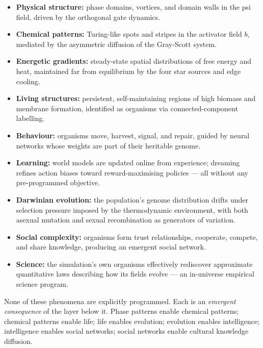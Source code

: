 \documentclass[12pt,a4paper]{article}
\begin{document}
\begin{itemize}
  \item \textbf{Physical structure:} phase domains, vortices,
    and domain walls in the psi field,
    driven by the orthogonal gate dynamics.

  \item \textbf{Chemical patterns:} Turing-like spots and stripes
    in the activator field $b$, mediated by the
    asymmetric diffusion of the Gray-Scott system.

  \item \textbf{Energetic gradients:} steady-state spatial
    distributions of free energy and heat, maintained far from
    equilibrium by the four star sources and edge cooling.

  \item \textbf{Living structures:} persistent, self-maintaining
    regions of high biomass and membrane formation,
    identified as organisms via connected-component labelling.

  \item \textbf{Behaviour:} organisms move, harvest, signal,
    and repair, guided by neural networks whose weights
    are part of their heritable genome.

  \item \textbf{Learning:} world models are updated online from
    experience; dreaming refines action biases toward
    reward-maximising policies — all without any
    pre-programmed objective.

  \item \textbf{Darwinian evolution:} the population's genome
    distribution drifts under selection pressure imposed by
    the thermodynamic environment, with both asexual mutation
    and sexual recombination as generators of variation.

  \item \textbf{Social complexity:} organisms form trust
    relationships, cooperate, compete, and share knowledge,
    producing an emergent social network.

  \item \textbf{Science:} the simulation's own organisms
    effectively rediscover approximate quantitative laws
    describing how its fields evolve —
    an in-universe empirical science program.
\end{itemize}

None of these phenomena are explicitly programmed.
Each is an \emph{emergent consequence} of the layer below it.
Phase patterns enable chemical patterns; chemical patterns
enable life; life enables evolution; evolution enables
intelligence; intelligence enables social networks;
social networks enable cultural knowledge diffusion.
\end{document}
